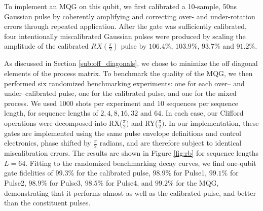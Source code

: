 \documentclass[aps,nofootinbib,pra,notitlepage,twocolumn]{revtex4-1}
\begin{document}
To implement an MQG on this qubit, we first calibrated a 10-sample, 50ns Gaussian pulse by coherently amplifying and correcting over- and under-rotation errors through repeated application. After the gate was sufficiently calibrated, four intentionally miscalibrated Gaussian pulses were produced by scaling the amplitude of the calibrated $RX(\frac{\pi}{2})$ pulse by $106.4\%$,  $103.9\%$, $93.7\%$ and $91.2\%$.

As discussed in Section \ref{sub:off_diagonals}, we chose to minimize the off diagonal elements of the process matrix. To benchmark the quality of the MQG, we then performed six randomized benchmarking experiments\cite{Magesan2011}: one for each over-- and under--calibrated pulse, one for the calibrated pulse, and one for the mixed process. We used $1000$ shots per experiment and $10$ sequences per sequence length, for sequence lengths of $2, 4, 8, 16, 32$ and $64$. In each case, our Clifford operations were decomposed into RX($\frac{\pi}{2})$ and RY($\frac{\pi}{2})$. In our implementation, these gates are implemented using the same pulse envelope definitions and control electronics, phase shifted by $\frac{\pi}{2}$ radians, and are therefore subject to identical miscalibration errors. The results are shown in Figure \ref{fig:rb} for sequence lengths $L=64$. Fitting to the randomized benchmarking decay curves, we find one-qubit gate fidelities of $99.3\%$ for the calibrated pulse, $98.9\%$ for Pulse1, $99.1\%$ for Pulse2, $98.9\%$ for Pulse3, $98.5\%$ for Pulse4, and $99.2\%$ for the MQG, demonstrating that it performs almost as well as the calibrated pulse, and better than the constituent pulses. 
\end{document}
